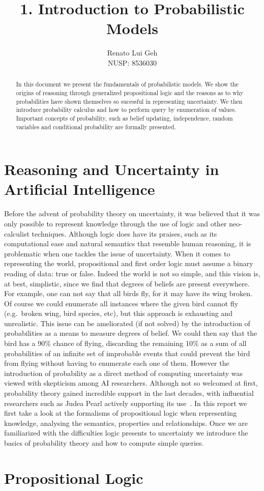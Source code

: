 \documentclass{amsart}
\title[]{1. Introduction to Probabilistic Models}
\author[]{Renato Lui Geh\\NUSP\@: 8536030}
\theoremstyle{plain}
\begin{document}
\maketitle

\begin{abstract}
  In this document we present the fundamentals of probabilistic models. We show the origins of
  reasoning through generalized propositional logic and the reasons as to why probabilities have
  shown themselves so sucessful in representing uncertainty. We then introduce probability calculus
  and how to perform query by enumeration of values. Important concepts of probability, such as
  belief updating, independence, random variables and conditional probability are formally
  presented.
\end{abstract}

\section{Reasoning and Uncertainty in Artificial Intelligence}

Before the advent of probability theory on uncertainty, it was believed that it was only possible
to represent knowledge through the use of logic and other neo-calculist techniques. Although logic
does have its praises, such as its computational ease and natural semantics that resemble human
reasoning, it is problematic when one tackles the issue of uncertainty. When it comes to
representing the world, propositional and first order logic must assume a binary reading of data:
true or false. Indeed the world is not so simple, and this vision is, at best, simplistic, since we
find that degrees of beliefs are present everywhere. For example, one can not say that all birds
fly, for it may have its wing broken. Of course we could enumerate all instances where the given
bird cannot fly (e.g.\ broken wing, bird species, etc), but this approach is exhausting and
unrealistic. This issue can be ameliorated (if not solved) by the introduction of probabilities as
a means to measure degrees of belief. We could then say that the bird has a 90\% chance of flying,
discarding the remaining 10\% as a sum of all probabilities of an infinite set of improbable events
that could prevent the bird from flying without having to enumerate each one of them. However the
introduction of probability as a direct method of computing uncertainty was viewed with skepticism
among AI researchers. Although not so welcomed at first, probability theory gained incredible
support in the last decades, with influential researchers such as Judea Pearl actively supporting
its use~\cite{pearl-1988}. In this report we first take a look at the formalisms of propositional
logic when representing knowledge, analysing the semantics, properties and relationships. Once
we are familiarized with the difficulties logic presents to uncertainty we introduce the basics
of probability theory and how to compute simple queries.

\section{Propositional Logic}



\newpage

\printbibliography[]
\end{document}
